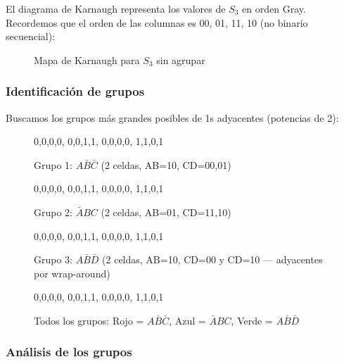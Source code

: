 \documentclass[11pt,a4paper]{article}
\begin{document}
El diagrama de Karnaugh representa los valores de $S_3$ en orden Gray. Recordemos que el orden de las columnas es 00, 01, 11, 10 (no binario secuencial):

\begin{figure}[H]
\centering
{}
\caption{Mapa de Karnaugh para $S_3$ sin agrupar}
\end{figure}

\subsubsection*{Identificación de grupos}

Buscamos los grupos más grandes posibles de 1s adyacentes (potencias de 2):

\begin{figure}[H]
\centering
{}%
  {0,0,0,0, 0,0,1,1, 0,0,0,0, 1,1,0,1}%
  {%
  }
\caption{Grupo 1: $A\bar{B}\bar{C}$ (2 celdas, AB=10, CD=00,01)}
\end{figure}

\begin{figure}[H]
\centering
{}%
  {0,0,0,0, 0,0,1,1, 0,0,0,0, 1,1,0,1}%
  {%
  }
\caption{Grupo 2: $\bar{A}BC$ (2 celdas, AB=01, CD=11,10)}
\end{figure}

\begin{figure}[H]
\centering
{}%
  {0,0,0,0, 0,0,1,1, 0,0,0,0, 1,1,0,1}%
  {%
  }
\caption{Grupo 3: $A\bar{B}\bar{D}$ (2 celdas, AB=10, CD=00 y CD=10 — adyacentes por wrap-around)}
\end{figure}

\begin{figure}[H]
\centering
{}%
  {0,0,0,0, 0,0,1,1, 0,0,0,0, 1,1,0,1}%
  {%
  }
\caption{Todos los grupos: Rojo = $A\bar{B}\bar{C}$, Azul = $\bar{A}BC$, Verde = $A\bar{B}\bar{D}$}
\end{figure}

\subsubsection*{Análisis de los grupos}
\end{document}
